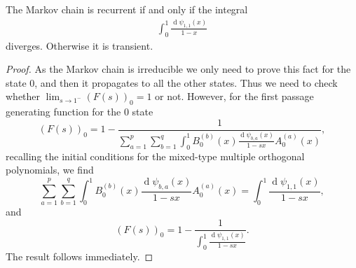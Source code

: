 \documentclass[10pt,a4paper]{amsart}
\renewcommand{\d}{\operatorname{d}}
\begin{document}
\begin{teo}
	The Markov chain is recurrent if and only if the integral
	\begin{align*}
		\int_0^{1}\frac{\d\psi_{1,1}(x)}{1-x}
	\end{align*}
	diverges. Otherwise it is transient.
\end{teo}

\begin{proof}
	As the Markov chain is irreducible we only need to prove this fact for the state $0$, and then it propagates to all the other states. Thus we need to check whether $\lim_{s\to1^-} (F(s))_0=1$ or not. However, for the first passage generating function for the $0$ state
	\[
	(F(s))_{0}=1-\frac{1}{\sum_{a=1}^p\sum_{b=1}^{q}	\int_0^1B^{(b)}_0(x)\frac{\d\psi_{b,a}(x)}{1-sx}A^{(a)}_{0}(x)},
	\]
	recalling the initial conditions for the mixed-type multiple orthogonal polynomials, we find
	\[
	\sum_{a=1}^p\sum_{b=1}^{q}\int_0^1B^{(b)}_0(x)\frac{\d\psi_{b,a}(x)}{1-sx}A^{(a)}_{0}(x)=
	\int_0^1\frac{\d\psi_{1,1}(x)}{1-sx},
	\]
	and
	\[
	(F(s))_{0}=1-\frac{1}{\int_0^1\frac{\d\psi_{1,1}(x)}{1-sx}}.
	\]
	The result follows immediately.
\end{proof}
\end{document}
